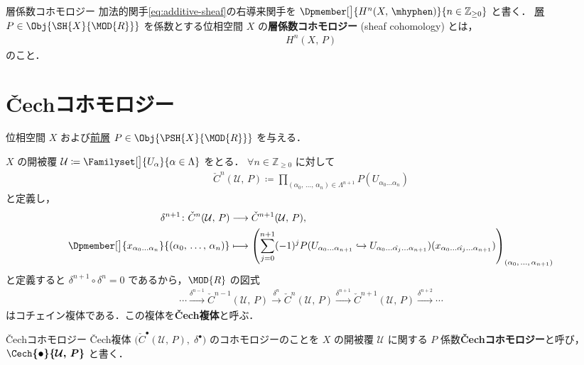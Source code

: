 \documentclass[TQFT_main]{subfiles}
\begin{document}
\begin{mydef}[label=def:sheaf-cohomology]{層係数コホモロジー}
    加法的関手\eqref{eq:additive-sheaf}の右導来関手を $\Dpmember[\big]{H^n(X,\, \mhyphen)}{n \in \mathbb{Z}_{\ge 0}}$ と書く．
    \hyperref[def:sheaf]{層} $P \in \Obj{\SH{X}{\MOD{R}}}$ を係数とする位相空間 $X$ の\textbf{層係数コホモロジー} (sheaf cohomology) とは，
    \begin{align}
        H^n(X,\, P)
    \end{align}
    のこと．
\end{mydef}

\section{\v{C}echコホモロジー}

位相空間 $X$ および\hyperref[def:presheaf]{前層} $P \in \Obj{\PSH{X}{\MOD{R}}}$ を与える．

$X$ の開被覆 $\mathcal{U} \coloneqq \Familyset[\big]{U_\alpha}{\alpha \in \Lambda}$ をとる．
$\forall n \in \mathbb{Z}_{\ge 0}$ に対して
\begin{align}
    \label{def:Cech-complex}
    \check{C}^n (\mathcal{U},\, P) \coloneqq \prod_{(\alpha_0,\, \dots,\, \alpha_n) \in \Lambda^{n+1}} P(U_{\alpha_0 \dots  \alpha_n})
\end{align}
と定義し，
\begin{align}
    \label{def:Cech-cobaundarymap}
    \delta^{n+1} \colon \check{C}^{n}(\mathcal{U},\, P) &\lto \check{C}^{n+1}(\mathcal{U},\, P),\\
    \Dpmember[\big]{x_{\alpha_0 \dots \alpha_n}}{(\alpha_0,\, \dots,\, \alpha_n)} 
    &\lmto \left(\sum_{j=0}^{n+1} (-1)^j P(U_{\alpha_0 \dots \alpha_{n+1}} \hookrightarrow U_{\alpha_0 \dots \hat{\alpha_j} \dots \alpha_{n+1}})(x_{\alpha_0 \dots \hat{\alpha_j} \dots \alpha_{n+1}})\right)_{(\alpha_0,\, \dots,\, \alpha_{n+1})}
\end{align}
と定義すると $\delta^{n+1} \circ \delta^n = 0$ であるから，$\MOD{R}$ の図式
\begin{align}
    \cdots \xrightarrow{\delta^{n-1}} \check{C}^{n-1} (\mathcal{U},\, P) \xrightarrow{\delta^n} \check{C}^n (\mathcal{U},\, P) \xrightarrow{\delta^{n+1}} \check{C}^{n+1}(\mathcal{U},\, P) \xrightarrow{\delta^{n+2}} \cdots
\end{align}
はコチェイン複体である．この複体を\textbf{\v{C}ech複体}と呼ぶ．

\begin{mydef}[label=def:cech-cohomology]{\v{C}echコホモロジー}
    \v{C}ech複体 $\bigl( \check{C}^\bullet (\mathcal{U},\, P),\; \delta^\bullet \bigr)$ のコホモロジーのことを
    $X$ の開被覆 $\mathcal{U}$ に関する $P$ 係数\textbf{\v{C}echコホモロジー}と呼び，
    $\bm{\Cech{\bullet}{\mathcal{U},\, P}}$ と書く．
\end{mydef}
\end{document}

